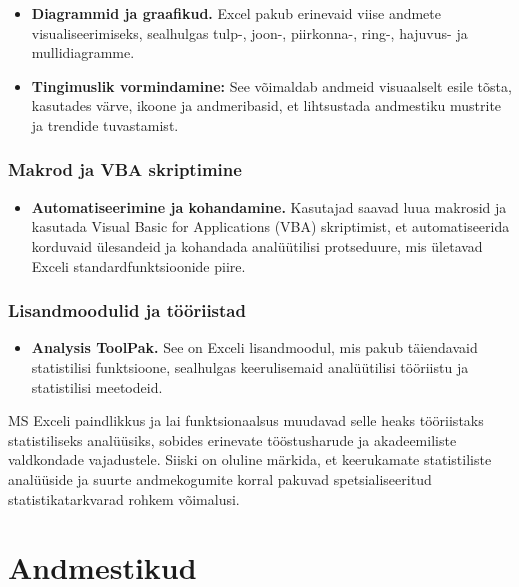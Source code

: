 \documentclass[
]{book}
\providecommand{\tightlist}{%
  \setlength{\itemsep}{0pt}\setlength{\parskip}{0pt}}
\begin{document}
\begin{itemize}
\tightlist
\item
  \textbf{Diagrammid ja graafikud.} Excel pakub erinevaid viise andmete visualiseerimiseks, sealhulgas tulp-, joon-, piirkonna-, ring-, hajuvus- ja mullidiagramme.
\item
  \textbf{Tingimuslik vormindamine:} See võimaldab andmeid visuaalselt esile tõsta, kasutades värve, ikoone ja andmeribasid, et lihtsustada andmestiku mustrite ja trendide tuvastamist.
\end{itemize}

\subsection{Makrod ja VBA skriptimine}\label{makrod-ja-vba-skriptimine}

\begin{itemize}
\tightlist
\item
  \textbf{Automatiseerimine ja kohandamine.} Kasutajad saavad luua makrosid ja kasutada Visual Basic for Applications (VBA) skriptimist, et automatiseerida korduvaid ülesandeid ja kohandada analüütilisi protseduure, mis ületavad Exceli standardfunktsioonide piire.
\end{itemize}

\subsection{Lisandmoodulid ja tööriistad}\label{lisandmoodulid-ja-tuxf6uxf6riistad}

\begin{itemize}
\tightlist
\item
  \textbf{Analysis ToolPak.} See on Exceli lisandmoodul, mis pakub täiendavaid statistilisi funktsioone, sealhulgas keerulisemaid analüütilisi tööriistu ja statistilisi meetodeid.
\end{itemize}

MS Exceli paindlikkus ja lai funktsionaalsus muudavad selle heaks tööriistaks statistiliseks analüüsiks, sobides erinevate tööstusharude ja akadeemiliste valdkondade vajadustele. Siiski on oluline märkida, et keerukamate statistiliste analüüside ja suurte andmekogumite korral pakuvad spetsialiseeritud statistikatarkvarad rohkem võimalusi.

\chapter{Andmestikud}\label{andmestikud}
\end{document}
